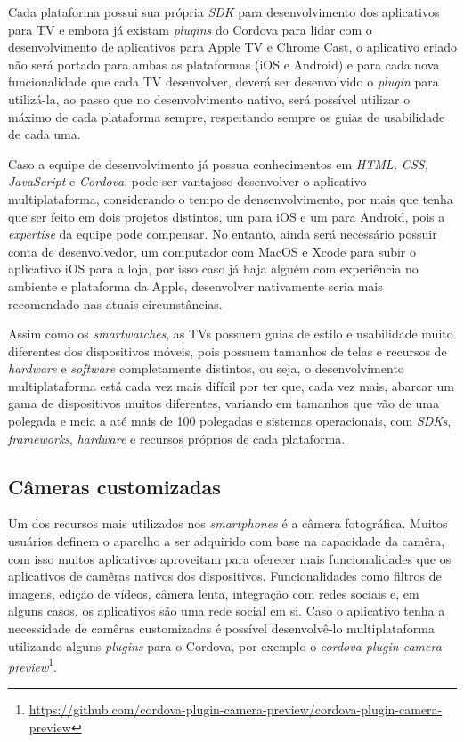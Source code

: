 Cada plataforma possui sua própria \textit{SDK} para desenvolvimento dos aplicativos para TV e embora já existam \textit{plugins} do Cordova para lidar com o desenvolvimento de aplicativos para Apple TV e Chrome Cast, o aplicativo criado não será portado para ambas as plataformas (iOS e Android) e para cada nova funcionalidade que cada TV desenvolver, deverá ser desenvolvido o \textit{plugin} para utilizá-la, ao passo que 
no desenvolvimento nativo, será possível utilizar o máximo de cada plataforma sempre, respeitando sempre os guias de usabilidade de cada uma. 

Caso a equipe de desenvolvimento já possua conhecimentos em \textit{HTML, CSS, JavaScript} e \textit{Cordova}, pode ser vantajoso desenvolver o aplicativo multiplataforma, considerando o tempo de densenvolvimento, por 
mais que tenha que ser feito em dois projetos distintos, um para iOS e um para Android, pois a \textit{expertise} da equipe pode compensar. No entanto, ainda será necessário possuir conta de desenvolvedor, um computador com 
MacOS e Xcode para subir o aplicativo iOS para a loja, por isso caso já haja alguém com experiência no ambiente e plataforma da Apple, desenvolver nativamente seria mais recomendado nas atuais circunstâncias. 

Assim como os \textit{smartwatches}, as TVs possuem guias de estilo e usabilidade muito diferentes dos dispositivos móveis, pois possuem tamanhos de telas e recursos de \textit{hardware} e \textit{software} completamente 
distintos, ou seja, o desenvolvimento multiplataforma está cada vez mais difícil por ter que, cada vez mais, abarcar um gama de dispositivos muitos diferentes, variando em tamanhos que vão de uma polegada e meia a
até mais de 100 polegadas e sistemas operacionais, com \textit{SDKs}, \textit{frameworks}, \textit{hardware} e recursos próprios de cada plataforma. 

\subsection{Câmeras customizadas} \label{subsec:customcamera}

Um dos recursos mais utilizados nos \textit{smartphones} é a câmera fotográfica. Muitos usuários definem o aparelho a ser adquirido com base na capacidade da camêra, com isso muitos aplicativos aproveitam para 
oferecer mais funcionalidades que os aplicativos de camêras nativos dos dispositivos. Funcionalidades como filtros de imagens, edição de vídeos, câmera lenta, integração com redes sociais e, em alguns casos, os aplicativos 
são uma rede social em si. Caso o aplicativo tenha a necessidade de camêras customizadas é possível desenvolvê-lo multiplataforma utilizando alguns \textit{plugins} para o Cordova, por exemplo o 
\textit{cordova-plugin-camera-preview}\footnote{\url{https://github.com/cordova-plugin-camera-preview/cordova-plugin-camera-preview}}.

